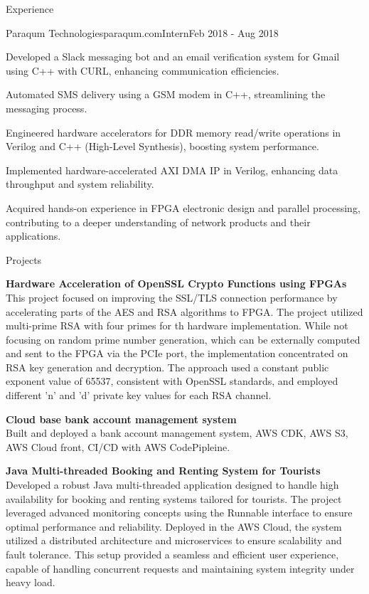 \documentclass[
	11pt, %
]{./assets/resume} %
\begin{document}
\begin{rSection}{Experience}
	\begin{rSubsectionX}{Paraqum Technologies}{paraqum.com}{Intern}{Feb 2018 - Aug 2018}
		\item Developed a Slack messaging bot and an email verification system for Gmail using C++ with CURL, enhancing communication efficiencies.
		\item Automated SMS delivery using a GSM modem in C++, streamlining the messaging process.
		\item Engineered hardware accelerators for DDR memory read/write operations in Verilog and C++ (High-Level Synthesis), boosting system performance.
		\item Implemented hardware-accelerated AXI DMA IP in Verilog, enhancing data throughput and system reliability.
		\item Acquired hands-on experience in FPGA electronic design and parallel processing, contributing to a deeper understanding of network products and their applications.
	\end{rSubsectionX}

\end{rSection}


\begin{rSection}{Projects}

	\textbf{Hardware Acceleration of OpenSSL Crypto Functions using FPGAs} \\
	This project focused on improving the SSL/TLS connection performance by accelerating parts of the AES and RSA algorithms to FPGA. The project utilized multi-prime RSA with four primes for th hardware implementation. While not focusing on random prime number generation, which can be externally computed and sent to the FPGA via the PCIe port, the implementation concentrated on RSA key generation and decryption. The approach used a constant public exponent value of 65537, consistent with OpenSSL standards, and employed different 'n' and 'd' private key values for each RSA channel.

	\textbf{Cloud base bank account management system} \\
	Built and deployed a bank account management system, AWS CDK, AWS S3, AWS Cloud front, CI/CD with AWS CodePipleine.

	\textbf{Java Multi-threaded Booking and Renting System for Tourists} \\
	Developed a robust Java multi-threaded application designed to handle high availability for booking and renting systems tailored for tourists. The project leveraged advanced monitoring concepts using the Runnable interface to ensure optimal performance and reliability. Deployed in the AWS Cloud, the system utilized a distributed architecture and microservices to ensure scalability and fault tolerance. This setup provided a seamless and efficient user experience, capable of handling concurrent requests and maintaining system integrity under heavy load.

\end{rSection}
\end{document}
